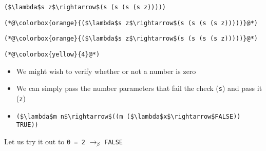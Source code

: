 \documentclass{beamer}
\begin{document}
\begin{frame}[fragile]{\CurrentSection}
\lstset{basicstyle=\ttfamily\small}\lstset{numbers=none}\lstset{language=ML}\begin{lstlisting}
($\lambda$s z$\rightarrow$(s (s (s (s z)))))
\end{lstlisting}
\pause\lstset{language=ML}\begin{lstlisting}
(*@\colorbox{orange}{($\lambda$s z$\rightarrow$(s (s (s (s z)))))}@*)
\end{lstlisting}

\end{frame}

\begin{frame}[fragile]{\CurrentSection}
\lstset{basicstyle=\ttfamily\small}\lstset{numbers=none}\lstset{language=ML}\begin{lstlisting}
(*@\colorbox{orange}{($\lambda$s z$\rightarrow$(s (s (s (s z)))))}@*)
\end{lstlisting}
\pause\lstset{language=ML}\begin{lstlisting}
(*@\colorbox{yellow}{4}@*)
\end{lstlisting}

\end{frame}

\begin{frame}[fragile]{\CurrentSection}
\begin{block}{\CurrentSubSection}
\begin{itemize}
\item We might wish to verify whether or not a number is zero
\item We can simply pass the number parameters that fail the check (\texttt{s}) and pass it (\texttt{z})
\item \lstset{basicstyle=\ttfamily\small}\lstset{numbers=none}\lstset{language=ML}\begin{lstlisting}
($\lambda$m n$\rightarrow$((m ($\lambda$x$\rightarrow$FALSE)) TRUE))
\end{lstlisting}


\end{itemize}

\end{block}


\end{frame}

\begin{frame}[fragile]{\CurrentSection}
\begin{block}{\CurrentSubSection}
Let us try it out to \texttt{0 = 2} $\rightarrow_\beta$ \texttt{FALSE}
\end{block}


\end{frame}
\end{document}
